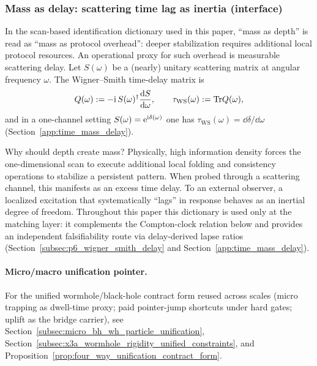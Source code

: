 \subsubsection{Mass as delay: scattering time lag as inertia (interface)}
\label{subsubsec:mass_as_delay_interface}
In the scan-based identification dictionary used in this paper, ``mass as depth'' is read as ``mass as protocol overhead'': deeper stabilization requires additional local protocol resources.
An operational proxy for such overhead is measurable scattering delay.
Let $S(\omega)$ be a (nearly) unitary scattering matrix at angular frequency $\omega$.
The Wigner--Smith time-delay matrix is
\[
Q(\omega):=-\mathrm{i}\,S(\omega)^\dagger\frac{\mathrm{d} S}{\mathrm{d} \omega},
\qquad
\tau_{\mathrm{WS}}(\omega):=\mathrm{Tr} Q(\omega),
\]
and in a one-channel setting $S(\omega)=\mathrm{e}^{\mathrm{i}\delta(\omega)}$ one has $\tau_{\mathrm{WS}}(\omega)=\dd\delta/\dd\omega$ (Section~\ref{app:time_mass_delay}).

Why should depth create mass?
Physically, high information density forces the one-dimensional scan to execute additional local folding and consistency operations to stabilize a persistent pattern.
When probed through a scattering channel, this manifests as an excess time delay.
To an external observer, a localized excitation that systematically ``lags'' in response behaves as an inertial degree of freedom.
Throughout this paper this dictionary is used only at the matching layer: it complements the Compton-clock relation below and provides an independent falsifiability route via delay-derived lapse ratios (Section~\ref{subsec:p6_wigner_smith_delay} and Section~\ref{app:time_mass_delay}).

\paragraph{Micro/macro unification pointer.}
\AuditTag For the unified wormhole/black-hole contract form reused across scales (micro trapping as dwell-time proxy; paid pointer-jump shortcuts under hard gates; uplift as the bridge carrier),
see Section~\ref{subsec:micro_bh_wh_particle_unification}, Section~\ref{subsec:x3a_wormhole_rigidity_unified_constraints}, and
Proposition~\ref{prop:four_way_unification_contract_form}.

